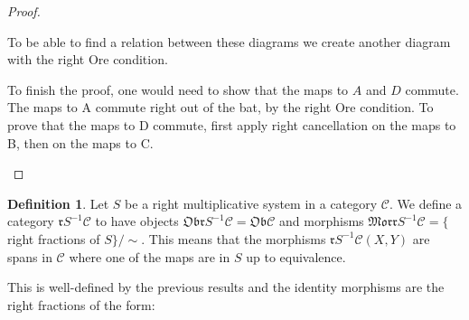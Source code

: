 \documentclass[12pt]{article}
\theoremstyle{definition}
\newtheorem{definition}{Definition}[section]
\theoremstyle{remark}
\begin{document}
\begin{proof}
\begin{center}
\begin{minipage}[c]{0.4\textwidth}
                    \end{minipage}
                \end{center}
                To be able to find a relation between these diagrams we create another diagram with the right Ore condition.
                \begin{center}
                    \begin{minipage}[c]{0.3\textwidth}
                    \end{minipage}
                    \begin{minipage}[c]{0.5\textwidth}
                        To finish the proof, one would need to show that the maps to $A$ and $D$ commute. The maps to A commute right out of the bat, by the right Ore condition. To prove that the maps to D commute, first apply right cancellation on the maps to B, then on the maps to C.
                    \end{minipage}
                \end{center}
            \end{proof}

            \begin{definition}
                Let $S$ be a right multiplicative system in a category $\mathcal{C}$. We define a category $\mathfrak{r}S^{-1}\mathcal{C}$ to have objects $\mathfrak{Obr}S^{-1}\mathcal{C}=\mathfrak{Ob}\mathcal{C}$ and morphisms $\mathfrak{Morr}S^{-1}\mathcal{C} = \{$right fractions of $S\}/\sim$. This means that the morphisms $\mathfrak{r}S^{-1}\mathcal{C}(X,Y)$ are spans in $\mathcal{C}$ where one of the maps are in $S$ up to equivalence.
                \begin{center}
                \end{center}
                This is well-defined by the previous results and the identity morphisms are the right fractions of the form:
                \begin{center}
                \end{center}
            \end{definition}
\end{document}
